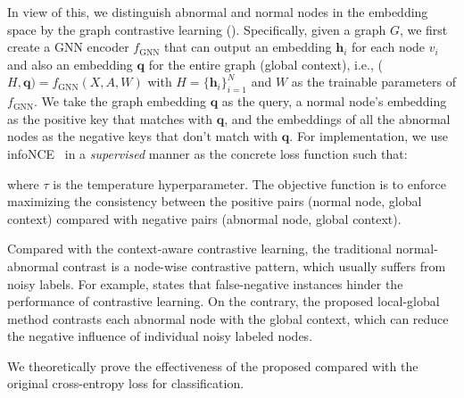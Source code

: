 In view of this, we distinguish abnormal and normal nodes in the embedding space by the graph contrastive learning (\model).
Specifically, given a graph ${G}$, we first create a GNN encoder $f_{\text{GNN}}$ that can output an embedding $\boldsymbol{h}_i$ for each node $v_i$ and also an embedding $\boldsymbol{q}$ for the entire graph (global context), i.e., (${H}, \boldsymbol{q}) = f_{\text{GNN}}({X}, {A}, {W})$ with $H = \{\boldsymbol{h}_i\}_{i=1}^{N}$ and $W$ as the trainable parameters of $f_{\text{GNN}}$. 
We take the graph embedding $\boldsymbol{q}$ as the query, a normal node's embedding as the positive key that matches with $\boldsymbol{q}$, and the embeddings of all the abnormal nodes as the negative keys that don't match with $\boldsymbol{q}$. 
For implementation, we use infoNCE~\cite{oord2018representation} in a \textit{supervised} manner 
as the concrete loss function such that:


\noindent where $\tau$ is the temperature hyperparameter. The objective function is to enforce maximizing the consistency between the positive pairs (normal node, global context) compared with negative pairs (abnormal node, global context). 

Compared with the context-aware contrastive learning, the traditional normal-abnormal contrast is a node-wise contrastive pattern, which usually suffers from noisy labels. For example, \cite{kalantidis2020hard} states that false-negative instances hinder the performance of contrastive learning. On the contrary, the proposed local-global method contrasts each abnormal node with the global context, which can reduce the negative influence of individual noisy labeled nodes. 


We theoretically prove the effectiveness of the proposed \smodel compared with the original cross-entropy loss for classification.

